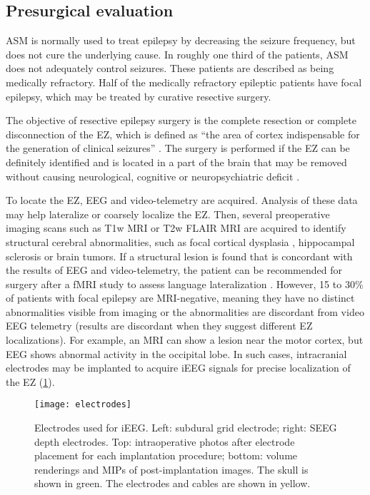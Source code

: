 \subsection{Presurgical evaluation}

\Ac{ASM} is normally used to treat epilepsy by decreasing the seizure frequency, but does not cure the underlying cause.
In roughly one third of the patients, \ac{ASM} does not adequately control seizures.
These patients are described as being medically refractory.
Half of the medically refractory epileptic patients have focal epilepsy, which may be treated by curative resective surgery.

The objective of resective epilepsy surgery is the complete resection or complete disconnection of the \ac{EZ}, which is defined as ``the area of cortex indispensable for the generation of clinical seizures'' \cite{rosenow_presurgical_2001}.
The surgery is performed if the \ac{EZ} can be definitely identified and is located in a part of the brain that may be removed without causing neurological, cognitive or neuropsychiatric deficit \cite{jobst_resective_2015}.

To locate the \ac{EZ}, \ac{EEG} and video-telemetry are acquired.
Analysis of these data may help lateralize or coarsely localize the \ac{EZ}.
Then, several preoperative imaging scans such as \ac{T1w} \ac{MRI} or \ac{T2w} \ac{FLAIR} \ac{MRI} are acquired to identify structural cerebral abnormalities, such as focal cortical dysplasia \cite{kabat_focal_2012}, hippocampal sclerosis \cite{thom_review_2014} or brain tumors.
If a structural lesion is found that is concordant with the results of \ac{EEG} and video-telemetry, the patient can be recommended for surgery after a \ac{fMRI} study to assess language lateralization \cite{duncan_brain_2016}.
However, 15 to 30\% of patients with focal epilepsy are \ac{MRI}-negative, meaning they have no distinct abnormalities visible from imaging or the abnormalities are discordant from video \ac{EEG} telemetry \cite{bien_characteristics_2009} (results are discordant when they suggest different \ac{EZ} localizations).
For example, an \ac{MRI} can show a lesion near the motor cortex, but \ac{EEG} shows abnormal activity in the occipital lobe.
In such cases, intracranial electrodes may be implanted to acquire \ac{iEEG} signals for precise localization of the \ac{EZ} (\cref{fig:electrodes}).

\begin{figure}[hbt!]
  \centering
  \texttt{[image: electrodes]}
  \caption[Electrodes used for intracranial EEG]{
    Electrodes used for \ac{iEEG}.
    Left: subdural grid electrode;
    right: \ac{SEEG} depth electrodes.
    Top: intraoperative photos after electrode placement for each implantation procedure;
    bottom: volume renderings and \acp{MIP} of post-implantation images.
    The skull is shown in green.
    The electrodes and cables are shown in yellow.
  }\label{fig:electrodes}
\end{figure}

